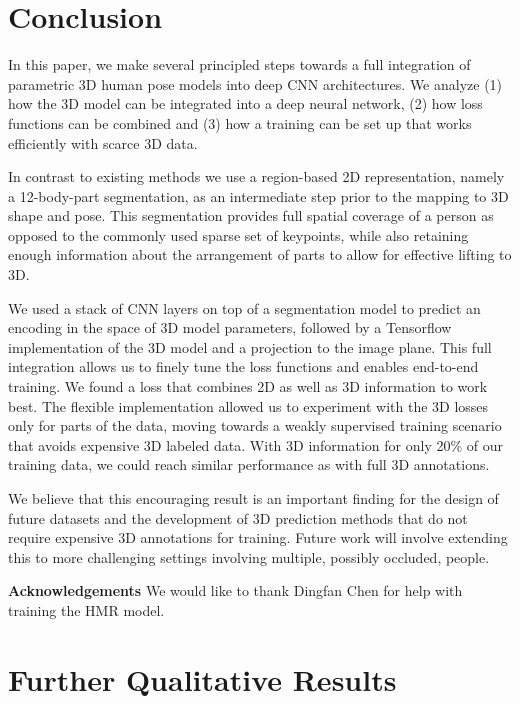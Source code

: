 \documentclass[10pt,twocolumn,letterpaper]{article}
\begin{document}
 \section{Conclusion}

In this paper, we make several principled steps towards a full integration of
parametric 3D human pose models into deep CNN architectures. We analyze (1) how
the 3D model can be integrated into a deep neural network, (2) how loss
functions can be combined and (3) how a training can be set up that works efficiently with scarce 3D data.

In contrast to existing methods we use a region-based 2D representation,
namely a 12-body-part segmentation, as an intermediate step prior to the 
mapping to 3D shape and pose. This segmentation provides full spatial coverage 
of a person as opposed to the commonly used sparse set of keypoints, while 
also retaining enough information about the arrangement of parts to allow
for effective lifting to 3D.

We used a stack of CNN layers on top of a segmentation model to predict
an encoding in the space of 3D model parameters, followed by a Tensorflow
implementation of the 3D model and a projection to the image plane. This full
integration allows us to finely tune the loss functions and enables end-to-end
training. We found a loss that combines 2D as well as 3D information to work best.
The flexible implementation allowed us to experiment with the 3D losses only for
parts of the data, moving towards a weakly supervised training scenario that
avoids expensive 3D labeled data. With 3D information for only 20\% of our
training data, we could reach similar performance as with full 3D annotations.

We believe that this encouraging result is an important finding for the
design of future datasets and the development of 3D prediction methods
that do not require expensive 3D annotations for training. Future work
will involve extending this to more challenging settings involving
multiple, possibly occluded, people. \vspace{0.1em}

\textbf{Acknowledgements} We would like to thank Dingfan Chen for help with training the HMR \cite{hmrKanazawa17} model.
 
\clearpage




\appendix

\section{Further Qualitative Results}
\end{document}
